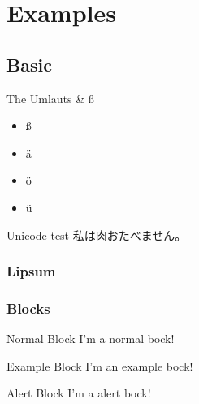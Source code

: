 \section{Examples}
\subsection{Basic}

\begin{frame}{The Umlauts \& ß}
	\begin{itemize}
		\item ß
		\item ä
		\item ö
		\item ü
	\end{itemize}
\end{frame}
\begin{frame}{Unicode test}
	\centering
	私は肉おたべません。
\end{frame}

\begin{frame}
	\frametitle{Lipsum}
	\centering
	\lipsum[1]
\end{frame}

\begin{frame}
	\frametitle{Blocks}
	\begin{block}{Normal Block}
		I'm a normal bock!
	\end{block}
	\begin{exampleblock}{Example Block}
		I'm an example bock!
	\end{exampleblock}
	\begin{alertblock}{Alert Block}
		I'm a alert bock!
	\end{alertblock}
\end{frame}

